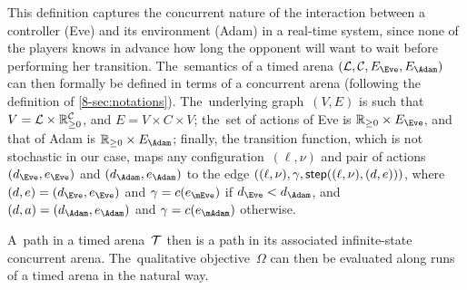 

This definition captures the concurrent nature of the interaction
between a controller (Eve) and its environment (Adam) in a real-time
system, since none of the players knows in advance how long the
opponent will want to wait before performing her transition.
The~semantics of a timed arena $(\Locs, \Clocks,\EE,\EA)$ can then
formally be defined in terms of a concurrent arena (following the
definition of \cref{8-sec:notations}).  The~underlying
graph~$(V,E)$ is such that $V=\mathcal{L}\times \mathbb{R}_{\geq 0}^{\mathcal{C}}$, and $E=
V\times C\times V$; the~set of actions of Eve is $\Realnn\times\EE$, and that
of Adam is $\Realnn\times\EA$; finally, the transition function,
which is not stochastic in our case, maps any
configuration~$(\ell,\nu)$ and pair of actions~$(d_\Eve,e_\Eve)$ and
$(d_\Adam,e_\Adam)$ to the edge $((\ell,\nu),\gamma,
\mathsf{step}((\ell,\nu),(d,e)))$, where $(d,e)=(d_\Eve,e_\Eve)$ and $\gamma=c(e_\mEve)$
if
$d_\Eve<d_\Adam$,  and $(d,a)=(d_\Adam,e_\Adam)$ and $\gamma=c(e_\mAdam)$ otherwise.

A~path in a timed arena~$\mathcal{T}$ then is a path in its
associated infinite-state concurrent arena. The~qualitative
objective~$\Omega$ can then be evaluated along runs of a timed arena in
the natural way.



